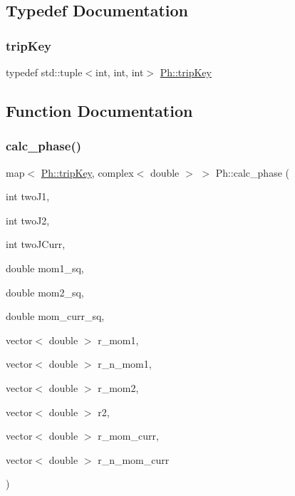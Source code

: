 \subsection{Typedef Documentation}
\mbox{\label{namespacePh_afdd5bf3d7b37625115089ea3048e0cbb}} 
\subsubsection{\texorpdfstring{tripKey}{tripKey}}
{\footnotesize\ttfamily typedef std\+::tuple$<$int, int, int$>$ \mbox{\hyperlink{namespacePh_afdd5bf3d7b37625115089ea3048e0cbb}{Ph\+::trip\+Key}}}



\subsection{Function Documentation}
\mbox{\label{namespacePh_a8662b8eefea46c114386b136878a461c}} 
\subsubsection{\texorpdfstring{calc\_phase()}{calc\_phase()}}
{\footnotesize\ttfamily map$<$ \mbox{\hyperlink{namespacePh_afdd5bf3d7b37625115089ea3048e0cbb}{Ph\+::trip\+Key}}, complex$<$ double $>$ $>$ Ph\+::calc\+\_\+phase (\begin{DoxyParamCaption}\item[{int}]{two\+J1,  }\item[{int}]{two\+J2,  }\item[{int}]{two\+J\+Curr,  }\item[{double}]{mom1\+\_\+sq,  }\item[{double}]{mom2\+\_\+sq,  }\item[{double}]{mom\+\_\+curr\+\_\+sq,  }\item[{vector$<$ double $>$}]{r\+\_\+mom1,  }\item[{vector$<$ double $>$}]{r\+\_\+n\+\_\+mom1,  }\item[{vector$<$ double $>$}]{r\+\_\+mom2,  }\item[{vector$<$ double $>$}]{r2,  }\item[{vector$<$ double $>$}]{r\+\_\+mom\+\_\+curr,  }\item[{vector$<$ double $>$}]{r\+\_\+n\+\_\+mom\+\_\+curr }\end{DoxyParamCaption})}

